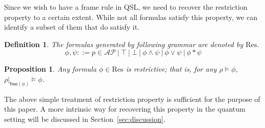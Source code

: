 \documentclass[conference,compsoc, 10pt]{IEEEtran}
\newtheorem{definition}{Definition}[section]
\newtheorem{proposition}{Proposition}[section]
\newcommand {\cD } {{\mathcal{D}}}
\newcommand {\cP } {{\mathcal{P}}}
\newcommand {\id } {{I}}
\newcommand {\bD} {{\mathbf{D}}}
\newcommand {\Lfree }[1] {{\mathsf{free}{\left(#1\right)}}}
\newcommand {\free }[1] {{\mathsf{free}\left(#1\right)}}
\newcommand {\res} {{\mathrm{Res}}}
\newcommand {\rt }[2] {{\left.{#1}\right|_{#2}}}
\newcommand {\AP} {{\mathcal{AP}}}
\DeclareRobustCommand{\dimp}{%
	\mathbin{\ooalign{$\rightarrow$\cr\hss\raisebox{1ex}{\scalebox{.5}{D}}\hss}}}
\providecommand{\todo}[1]{{\protect\color{red}\noindent {\bf [todo]}\emph{#1} {\bf [/todo]}}}
\begin{document}
	
  Since we wish to have a frame rule in QSL, we need to recover the restriction property to a certain extent.
  While not all formulas satisfy this property, we can identify a subset of them  that
  do satisfy it.
	\begin{definition}
		\label{def Res}
		The formulas generated by following grammar are denoted by $\res$.%
		$$
		\phi,\psi ::= p\in\AP\ |\ \top\ |\ \bot\ |\ \phi\wedge\psi\ |\ \phi\vee\psi\ |\ \phi\ast\psi
		$$
	\end{definition} 
	\begin{proposition}
		\label{pro res set}
		Any formula $\phi\in\res$ is restrictive; that is, for any $\rho\models\phi$, $\rt{\rho}{\free{\phi}}\models\phi$.
	\end{proposition}
	
	The above simple treatment of restriction property is sufficient for the purpose of this paper. A more intrinsic way for recovering this property in the quantum setting will be discussed in Section~\ref{sec:discussion}. 
	
	
\end{document}
